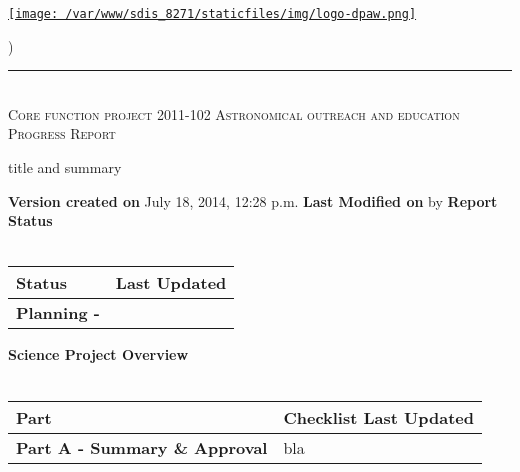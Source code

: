 \documentclass[version=last, paper=a4, DIV=18, usenames, dvipsnames]{scrartcl}
\newcommand{\HRule}{\rule{\linewidth}{0.1pt}}
\begin{document}
\setcounter{secnumdepth}{-1}


\begin{titlepage}
\begin{center}
\begin{minipage}[t]{0.28\textwidth}
\begin{flushleft}
\href{http://www.dpaw.wa.gov.au}{\texttt{[image: /var/www/sdis\_8271/staticfiles/img/logo-dpaw.png]}}
\end{flushleft}
\end{minipage}
\begin{minipage}[b]{0.7\textwidth}
\begin{flushright}
    \href{http://sdis.dpaw.wa.gov.au/documents/progressreport/1249/download/tex/}{}) \\
\end{flushright}
\end{minipage}
\HRule \\[0.4cm]
\vfill
\textsc{\Huge Core function project 2011-102 Astronomical outreach and education \newline }
\vfill
\textsc{\Huge Progress Report}

\vfill\vfill\vfill\vfill
title and summary

\vfill\vfill\vfill\vfill\vfill\vfill\vfill\vfill

\textbf{Version created on} July 18, 2014, 12:28 p.m.
\vfill
\textbf{Last Modified on}  by 
\vfill\vfill
\textbf{Report Status}\\\,
\begin{tabu} to \linewidth { | X[l] | X | }
\hline
{}
Status & Last Updated \\
\hline
\textbf{Planning - } \\
\hline
\end{tabu}
\vfill
\textbf{Science Project Overview}\\\,
\begin{tabu} to \linewidth { | X[l] | X | }
\hline
{}
Part & Checklist Last Updated \\
\hline
\textbf{Part A - Summary \& Approval} & bla \\
\hline
\end{tabu}

\end{center}
\end{titlepage}

\setcounter{tocdepth}{2}
\tableofcontents
\clearpage
\end{document}
